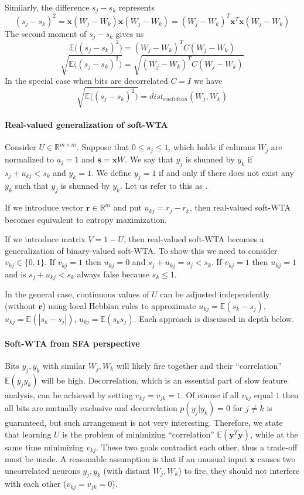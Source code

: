 \documentclass[12pt]{article}
\begin{document}
Similarly, the difference $s_j-s_k$ represents
\[
(s_j - s_k)^2 = \boldsymbol{x} (W_j - W_k) \boldsymbol{x} (W_j - W_k) = (W_j - W_k)^T \boldsymbol{x}^T \boldsymbol{x} (W_j - W_k) 
\]
The second moment of $s_j-s_k$ gives us
\[
\mathbb{E}\big((s_j - s_k)^2\big) = (W_j - W_k)^T C (W_j - W_k)
\]
\[
\sqrt{\mathbb{E}\big((s_j - s_k)^2\big)} = \sqrt{(W_j - W_k)^T C (W_j - W_k) }
\]
In the special case when bits are decorrelated $C=I$ we have
\[
\sqrt{\mathbb{E}\big((s_j - s_k)^2\big)} = dist_{euclidean}(W_j,W_k)
\]



\paragraph{Real-valued generalization of soft-WTA}

Consider $U \in \mathbb{R}^{m\times m}$. Suppose that $0\le s_j\le 1$, which holds if columns $W_j$ are normalized to $a_j=1$ and $\boldsymbol{s}=\boldsymbol{x} W$. 
We say that $y_j$ is shunned by $y_k$ if  $s_j+u_{kj}<s_k$ and $y_k=1$. We define $y_j=1$ if and only if there does not exist any $y_k$ such that  $y_j$ is shunned by $y_k$. Let us refer to this as .

If we introduce vector $\boldsymbol{r}\in \mathbb{R}^m$ and put $u_{kj}=r_j-r_k$, then real-valued soft-WTA becomes equivalent to entropy maximization. 

If we introduce matrix $V=1-U$, then real-valued soft-WTA becomes a generalization of binary-valued soft-WTA. To show this we need to consider $v_{kj} \in \{0,1\}$. If $v_{kj}=1$ then $u_{kj}=0$ and $s_j+u_{kj}=s_j<s_k$. If $v_{kj}=1$ then $u_{kj}=1$ and is $s_j+u_{kj}<s_k$ always false because $s_k \le  1$. 

In the general case, continuous values of $U$ can be adjusted independently (without $\boldsymbol{r}$) using local Hebbian rules to approximate $u_{kj}=\mathbb{E}(s_k-s_j)$,  $u_{kj}=\mathbb{E}(|s_k-s_j|)$, $u_{kj}=\mathbb{E}(s_ks_j)$. Each approach is discussed in depth below. 


\paragraph{Soft-WTA from SFA perspective}
Bits $y_j,y_k$ with similar $W_j,W_k$ will likely fire together and their ``correlation'' $\mathbb{E}(y_j y_k)$ will be high. Decorrelation, which is an essential part of slow feature analysis, can be achieved by setting $v_{kj}=v_{jk}=1$. Of course if all $v_{kj}$ equal $1$ then all bits are mutually exclusive and decorrelation $p(y_j|y_k) = 0$ for $j\ne k$ is guaranteed, but such arrangement is not very interesting. Therefore, we state that learning $U$ is the problem of minimizing ``correlation'' $\mathbb{E}(\boldsymbol{y}^T \boldsymbol{y})$, while at the same time minimizing $v_{kj}$. These two goals contradict each other, thus a trade-off  must be made. A reasonable assumption is that if an unusual input $\boldsymbol{x}$ causes two uncorrelated neurons $y_j,y_k$ (with distant $W_j,W_k$) to fire, they should not interfere with each other ($v_{kj}=v_{jk}=0$). 
\end{document}
